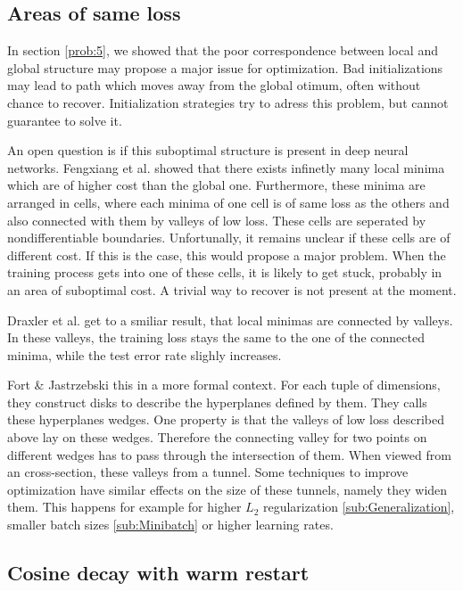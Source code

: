 \subsection{Areas of same loss}\label{loss_landscape}
In section \ref{prob:5}, we showed that the poor correspondence between local
and global structure may propose a major issue for optimization. Bad
initializations may lead to path which moves away from the global otimum, often
without chance to recover. Initialization strategies try to adress this problem,
but cannot guarantee to solve it.

An open question is if this suboptimal structure is present in deep neural
networks. Fengxiang et al. \cite{he2020piecewise} showed that there exists
infinetly many local minima which are of higher cost than the global one.
Furthermore, these minima are arranged in cells, where each minima of one cell
is of same loss as the others and also connected with them by valleys of low
loss. These cells are seperated by nondifferentiable boundaries. Unfortunally,
it remains unclear if these cells are of different cost. If this is the case,
this would propose a major problem. When the training process gets into one of
these cells, it is likely to get stuck, probably in an area of suboptimal cost.
A trivial way to recover is not present at the moment.

Draxler et al. \cite{draxler2018essentially} get to a smiliar result, that local
minimas are connected by valleys. In these valleys, the training loss stays the
same to the one of the connected minima, while the test error rate slighly
increases.

Fort \& Jastrzebski \cite{fort2019large}  this in a more formal context. For
each tuple of dimensions, they construct disks to describe the hyperplanes
defined by them. They calls these hyperplanes wedges. One property is that the
valleys of low loss described above lay on these wedges. Therefore the
connecting valley for two points on different wedges has to pass through the
intersection of them. When viewed from an cross-section, these valleys from a
tunnel. Some techniques to improve optimization have similar effects on the size
of these tunnels, namely they widen them. This happens for example for higher
$L_2$ regularization \ref{sub:Generalization}, smaller batch sizes
\ref{sub:Minibatch} or higher learning rates.


\subsection{Cosine decay with warm restart}\label{sub:cosine_decay}

